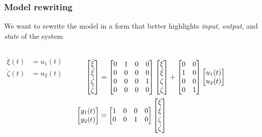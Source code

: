 \begin{frame} 
	\frametitle{Model rewriting}
	We want to rewrite the model in a form that better highlights \emph{input}, \emph{output}, and \emph{state} of the system
    \begin{columns}[onlytextwidth]
        \begin{align*}
        \ddot{\xi}(t)& = u_1(t) \\
        \ddot{\zeta}(t)& = u_2(t)
        \end{align*}
    	\begin{align*}
    	  \begin{bmatrix}\dot{\xi}\\\ddot{\xi}\\\dot{\zeta}\\\ddot{\zeta}\end{bmatrix}&=
          \begin{bmatrix}0&1&0&0\\0&0&0&0\\0&0&0&1\\0&0&0&0\end{bmatrix}\begin{bmatrix}\xi\\\dot{\xi}\\{\zeta}\\\dot{\zeta}\end{bmatrix} + \begin{bmatrix}0&0\\1  &0\\0&0 \\0&1\end{bmatrix} \begin{bmatrix}u_1(t)\\u_2(t)\end{bmatrix}\\
          \begin{bmatrix}y_1(t)\\y_2(t)\end{bmatrix}&=\begin{bmatrix}1&0&0&0\\0&0&1&0\end{bmatrix}\begin{bmatrix}\xi\\\dot{\xi}\\{\zeta}\\\dot{\zeta}\end{bmatrix}
    	\end{align*}
    \end{columns}
\end{frame}

